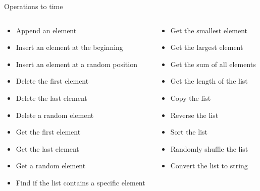 \begin{frame}{Operations to time}
	\footnotesize
	\begin{columns}
		\begin{column}{0.45\textwidth}
			\begin{itemize}
				\item Append an element
				\item Insert an element at the beginning
				\item Insert an element at a random position
				\item Delete the first element
				\item Delete the last element
				\item Delete a random element
				\item Get the first element
				\item Get the last element
				\item Get a random element
				\item Find if the list contains a specific element
			\end{itemize}
		\end{column}
		\begin{column}{0.45\textwidth}
			\begin{itemize}
				\item Get the smallest element
				\item Get the largest element
				\item Get the sum of all elements
				\item Get the length of the list
				\item Copy the list
				\item Reverse the list
				\item Sort the list
				\item Randomly shuffle the list
				\item Convert the list to string
			\end{itemize}
		\end{column}
	\end{columns}
\end{frame}
